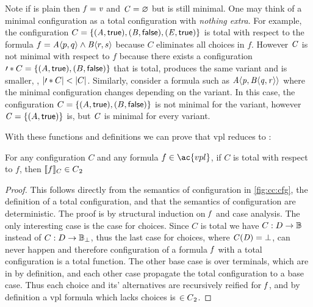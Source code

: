 Note if \fV{} is plain then $\mathit{f}{} = \mathit{v}$ and $\mathit{C} = \varnothing$ but is
still minimal. One may think of a minimal configuration as a total configuration
with \emph{nothing extra}. For example, the configuration $C = \{\kf{(A,\true),
  (B,\false),(E,\true)}\}$ is total with respect to the formula $f =
\chc[A]{p,q}\wedge\chc[B]{r,s}$ because $C$ eliminates all choices in $f$.
However $\mathit{C}$ is not minimal with respect to $f$ because there exists a
configuration $\prime*{C} = \set{(A,\true), (B,\false)}$ that is total, produces
the same variant and is smaller, \ie{}, $|\prime*{C}| <
|C|$. Similarly, consider a formula such as $\chc[A]{\pV{},
  \chc[B]{\qV{}, \rV{}}}$ where the minimal configuration changes depending on
the variant. In this case, the configuration $C = \set{(A, \true), (B, \false)}$
is not minimal for the  variant, however $\kf{C} =
\set{(A,\true)}$ is, but $\mathit{C}$ is minimal for every  variant.

With these functions and definitions we can prove that \ac{vpl} reduces to
\pl{}:
%
\begin{theorem}%
  \label{thm:vpltopl}
  For any configuration $C$ and any formula $f \in \ac{vpl}$, if $C$ is total
  with respect to $f$, then $\sem[C]{f} \in \pl{}$
\end{theorem}
%
\begin{proof}
  This follows directly from the semantics of configuration in
  \autoref{fig:cc:cfg}, the definition of a total configuration, and that the
  semantics of configuration are deterministic. The proof is by structural
  induction on $\mathit{f}$ and case analysis. The only interesting case is the case
  for choices. Since $C$ is total we have $C : D \rightarrow \mathbb{B}{}$
  instead of $C : D \rightarrow \mathbb{B}{}_{\bot}$, thus the last case for
  choices, where $\mathit{C(D)} = \bot$, can never happen and therefore
  configuration of a formula $\mathit{f}$ with a total configuration is a total
  function. The other base case is over terminals, which are in \pl{} by
  definition, and each other case propagate the total configuration to a base
  case. Thus each choice and its' alternatives are recursively reified for
  $\mathit{f}$, and by definition a \ac{vpl} formula which lacks choices is $\in
  {C\textsubscript{2}}{}$.
\end{proof}


